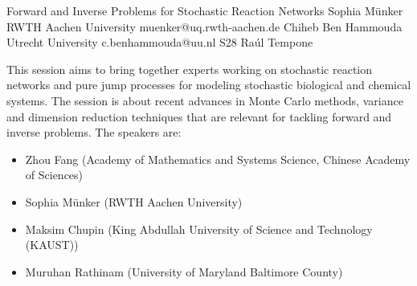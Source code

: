 \begin{session}
 {Forward and Inverse Problems for Stochastic Reaction Networks}%
 {Sophia Münker}%
 {RWTH Aachen University}%
 {muenker@uq.rwth-aachen.de}%
 {Chiheb Ben Hammouda}%
 {Utrecht University}%
 {c.benhammouda@uu.nl}%
 {S28}%
 {Raúl Tempone}%

 This session aims to bring together experts working on stochastic reaction networks and pure jump processes for modeling stochastic biological and chemical systems. The session is about recent advances in Monte Carlo methods, variance and dimension reduction techniques that are relevant for tackling forward and inverse problems.
 \medskip
 The speakers are:
 \begin{itemize}
 \item Zhou Fang (Academy of Mathematics and Systems Science, Chinese Academy of Sciences)
 \item Sophia Münker (RWTH Aachen University)
 \item Maksim Chupin (King Abdullah University of Science and Technology (KAUST))
 \item Muruhan Rathinam (University of Maryland Baltimore County)
 \end{itemize}
\end{session}



\clearpage

